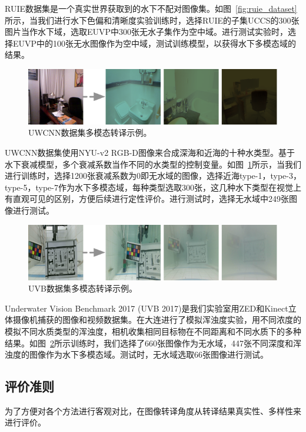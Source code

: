 RUIE数据集是一个真实世界获取到的水下不配对图像集。如图~\ref{fig:ruie_dataset}所示，当我们进行水下色偏和清晰度实验训练时，选择RUIE的子集UCCS的300张图片当作水下域，选取EUVP中300张无水子集作为空中域。进行测试实验时，选择EUVP中的100张无水图像作为空中域，测试训练模型，以获得水下多模态域的结果。

\begin{figure}[htp]
    \centering
	\includegraphics[width=\textwidth]{figures/uwcnn-dataset.pdf}
	\caption{UWCNN数据集多模态转译示例。}
	\label{fig:uwcnn_dataset}
\end{figure}

UWCNN数据集使用NYU-v2 RGB-D图像来合成深海和近海的十种水类型。基于水下衰减模型，多个衰减系数当作不同的水类型的控制变量。如图~\ref{fig:uwcnn_dataset}所示，当我们进行训练时，选择1200张衰减系数为0即无水域的图像，选择近海type-1，type-3，type-5，type-7作为水下多模态域，每种类型选取300张，这几种水下类型在视觉上有直观可见的区别，方便后续进行定性评价。进行测试时，选择无水域中249张图像进行测试。

\begin{figure}[htp]
    \centering
	\includegraphics[width=\textwidth]{figures/uvb-dataset.pdf}
	\caption{UVB数据集多模态转译示例。}
	\label{fig:uvb_dataset}
\end{figure}

Underwater Vision Benchmark 2017 (UVB 2017)是我们实验室用ZED和Kinect立体摄像机捕获的图像和视频数据集。在大连进行了模拟浑浊度实验，用不同浓度的模拟不同水质类型的浑浊度，相机收集相同目标物在不同距离和不同水质下的多种结果。如图~\ref{fig:uvb_dataset}所示训练时，我们选择了660张图像作为无水域，447张不同深度和浑浊度的图像作为水下多模态域。测试时，无水域选取66张图像进行测试。

\subsection{评价准则}
为了方便对各个方法进行客观对比，在图像转译角度从转译结果真实性、多样性来进行评价。

